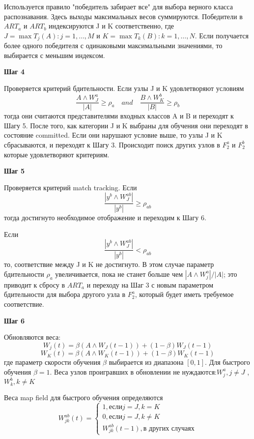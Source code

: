 Используется правило "победитель забирает все" для выбора верного класса распознавания. Здесь выходы максимальных весов суммируются. Победители в $ART_a$ и $ART_b$ индексируются J и K соответственно, где $J = \max{T_j(A):j=1, \ldots, M}$ и $K = \max{T_k(B):k=1, \ldots, N}$. Если получается более одного победителя с одинаковыми максимальными значениями, то выбирается с меньшим индексом.

\textbf{Шаг 4}

Проверяется критерий бдительности. Если узлы J и K удовлетворяют условиям
$$
	\frac{A \wedge W_J^a}{|A|} \geq \rho_a \quad and \quad \frac{B \wedge W_K^b}{|B|} \geq \rho_b
$$
тогда они считаются представителями входных классов A и B и переходят к Шагу 5.  После того, как категории J и K выбраны для обучения они переходят в состояние committed. Если они нарушают условие выше, то узлы J и K сбрасываются, и переходят к Шагу 3. Происходит поиск других узлов в $F_2^a$ и $F_2^b$ которые удовлетворяют критериям.

\textbf{Шаг 5}
	
Проверяется критерий match tracking. Если
$$ 
	\frac{|y^b \wedge W_J^{ab}|}{|y^b|} \geq \rho_{ab}
$$
тогда достигнуто необходимое отображение и переходим к Шагу 6.

Если
$$ 
	\frac{|y^b \wedge W_J^{ab}|}{|y^b|} < \rho_{ab}
$$
то, соответствие между J и K не достигнуто. В этом случае параметр бдительности $\rho_a$ увеличивается, пока не станет больше чем $|A \wedge W_j^a| / |A|$; это приводит к сбросу в $ART_a$ и переходу на Шаг 3 с новым параметром бдительности для выбора другого узла в $F_2^a$, который будет иметь требуемое соответствие.

\textbf{Шаг 6}

Обновляются веса:
$$ 
	W_j(t) = \beta(A \wedge W_J(t-1)) + (1-\beta) W_J (t-1)
$$
$$ 
	W_K(t) = \beta(A \wedge W_K(t-1)) + (1-\beta) W_K (t-1)
$$
где параметр скорости обучения $\beta$ выбирается из диапазона $[0,1]$. Для быстрого обучения $\beta = 1$. Веса узлов проигравших в обновлении не нуждаются:$W_j^a, j\neq J$ , $W_k^b, k\neq K$

Веса map field для быстрого обучения определяются
\begin{displaymath}
	W_{jk}^{ab} (t) = \left\{
	\begin{array}{l}
		1, \mbox{если} j=J, k=K \\
		0, \mbox{если} j=J, k\neq K \\
		W_{jk}^{ab}(t-1), \mbox{в других случаях}
	\end{array}
\right .
\end{displaymath}

